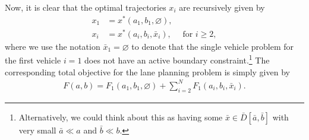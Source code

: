 \documentclass[a4paper]{article}
\theoremstyle{definition}
\theoremstyle{plain}
\begin{document}
Now, it is clear that the optimal trajectories $x_{i}$ are recursively given
by
\begin{subequations}
\begin{align}
  x_{1} &= x^{*}(a_{1}, b_{1}, \varnothing) , \\
  x_{i} &= x^{*}(a_{i}, b_{i}, \bar{x}_{i})  ,  \quad \text{ for } i \geq 2 ,
\end{align}
\end{subequations}
%
where we use the notation $\bar{x}_{1} = \varnothing$ to denote that the single vehicle
problem for the first vehicle $i=1$ does not have an active boundary
constraint.\footnote{Alternatively, we could think about this as having some $\bar{x} \in \bar{D}[\bar{a},\bar{b}]$ with very small $\bar{a} \ll a$ and $\bar{b} \ll b$.}
%
The corresponding total objective for the lane planning problem is simply given
by
\begin{align}
  F(a, b) = F_{1}(a_{1}, b_{1}, \varnothing) + \sum_{i=2}^{N} F_{1}(a_{i}, b_{i}, \bar{x}_{i}) .
\end{align}
\end{document}
